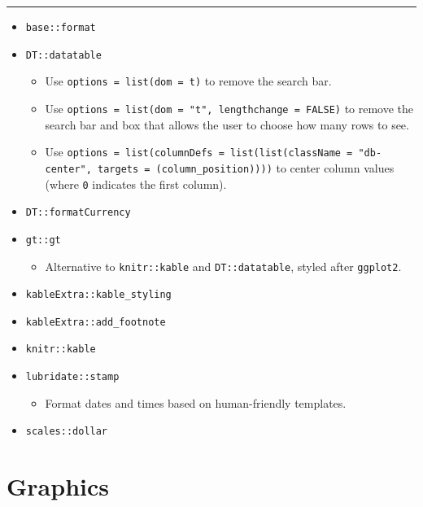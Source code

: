 \documentclass[
]{book}
\providecommand{\tightlist}{%
  \setlength{\itemsep}{0pt}\setlength{\parskip}{0pt}}
\begin{document}
\begin{center}\rule{0.5\linewidth}{0.5pt}\end{center}

\begin{itemize}
\tightlist
\item
  \texttt{base::format}
\item
  \texttt{DT::datatable}

  \begin{itemize}
  \tightlist
  \item
    Use \texttt{options\ =\ list(dom\ =\ \textquotesingle{}t\textquotesingle{})} to remove the search bar.
  \item
    Use \texttt{options\ =\ list(dom\ =\ "t",\ lengthchange\ =\ FALSE)} to remove the search bar and box that allows the user to choose how many rows to see.
  \item
    Use \texttt{options\ =\ list(columnDefs\ =\ list(list(className\ =\ "db-center",\ targets\ =\ (column\_position))))} to center column values (where \texttt{0} indicates the first column).
  \end{itemize}
\item
  \texttt{DT::formatCurrency}
\item
  \texttt{gt::gt}

  \begin{itemize}
  \tightlist
  \item
    Alternative to \texttt{knitr::kable} and \texttt{DT::datatable}, styled after \texttt{ggplot2}.
  \end{itemize}
\item
  \texttt{kableExtra::kable\_styling}
\item
  \texttt{kableExtra::add\_footnote}
\item
  \texttt{knitr::kable}
\item
  \texttt{lubridate::stamp}

  \begin{itemize}
  \tightlist
  \item
    Format dates and times based on human-friendly templates.
  \end{itemize}
\item
  \texttt{scales::dollar}
\end{itemize}

\hypertarget{graphics}{%
\section{Graphics}\label{graphics}}
\end{document}
